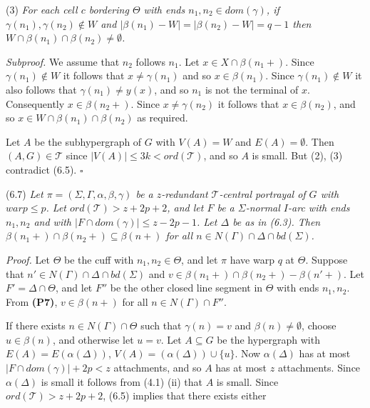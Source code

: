\hspace*{12pt}(3) \textit{For each cell $c$ bordering $\Theta$ with ends $n_1, n_2 \in dom(\gamma)$, if $\gamma(n_1), \gamma(n_2) \notin W$ and $|\beta(n_1) - W| = |\beta(n_2) - W| = q - 1$ then $W \cap \beta(n_1) \cap \beta(n_2) \ne \emptyset$.}

\textit{Subproof.} We assume that $n_2$ follows $n_1$. Let $x \in X \cap \beta(n_1 +)$. Since $\gamma(n_1) \notin W$ it follows that $x \ne \gamma(n_1)$ and so $x \in \beta(n_1)$. Since $\gamma(n_1) \notin W$ it also follows that $\gamma(n_1) \ne y(x)$, and so $n_1$ is not the terminal of $x$. Consequently $x \in \beta(n_2 +)$. Since $x \ne \gamma(n_2)$ it follows that $x \in \beta(n_2)$, and so $x \in W \cap \beta(n_1) \cap \beta(n_2)$ as required.

Let $A$ be the subhypergraph of $G$ with $V(A) = W$ and $E(A) = \emptyset$. Then $(A, G) \in \mathscr{T}$ since $|V(A)| \le 3k < ord(\mathscr{T})$, and so $A$ is small. But (2), (3) contradict (6.5). $\square$

\stmt
(6.7) \textit{Let $\pi = (\Sigma, \Gamma, \alpha, \beta, \gamma)$ be a $z$-redundant $\mathscr{T}$-central portrayal of $G$ with $warp \le p$. Let $ord(\mathscr{T}) > z + 2p + 2$, and let $F$ be a $\Sigma$-normal $I$-arc with ends $n_1, n_2$ and with $|F \cap dom(\gamma)| \le z - 2p - 1$. Let $\Delta$ be as in (6.3). Then $\beta(n_1 +) \cap \beta(n_2 +) \subseteq \beta(n+)$ for all $n \in N(\Gamma) \cap \Delta \cap bd(\Sigma)$.}

\textit{Proof.} Let $\Theta$ be the cuff with $n_1, n_2 \in \Theta$, and let $\pi$ have warp $q$ at $\Theta$. Suppose that $n' \in N(\Gamma) \cap \Delta \cap bd(\Sigma)$ and $v \in \beta(n_1 +) \cap \beta(n_2 +) - \beta(n'+)$. Let $F' = \Delta \cap \Theta$, and let $F''$ be the other closed line segment in $\Theta$ with ends $n_1, n_2$. From \textbf{(P7)}, $v \in \beta(n+)$ for all $n \in N(\Gamma) \cap F''$.

If there exists $n \in N(\Gamma) \cap \Theta$ such that $\gamma(n) = v$ and $\beta(n) \ne \emptyset$, choose $u \in \beta(n)$, and otherwise let $u = v$. Let $A \subseteq G$ be the hypergraph with $E(A) = E(\alpha(\Delta))$, $V(A) = (\alpha(\Delta)) \cup \{u\}$. Now $\alpha(\Delta)$ has at most $|F \cap dom(\gamma)| + 2p < z$ attachments, and so $A$ has at most $z$ attachments. Since $\alpha(\Delta)$ is small it follows from (4.1) (ii) that $A$ is small. Since $ord(\mathscr{T}) > z + 2p + 2$, (6.5) implies that there exists either

